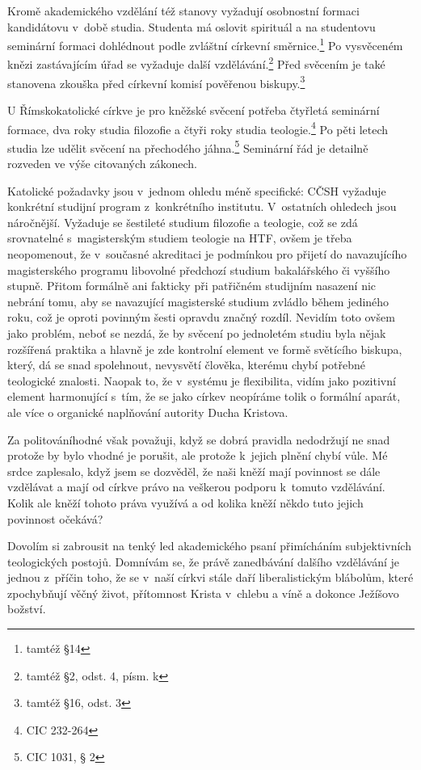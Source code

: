 Kromě akademického vzdělání též stanovy vyžadují osobnostní formaci kandidátovu
v~době studia. Studenta má oslovit spirituál a na studentovu seminární formaci
dohlédnout podle zvláštní církevní směrnice.\footnote{tamtéž §14}
Po vysvěceném knězi zastávajícím úřad se vyžaduje další
vzdělávání.\footnote{tamtéž §2, odst. 4, písm. k}
Před svěcením je také stanovena zkouška před církevní komisí pověřenou
biskupy.\footnote{tamtéž §16, odst. 3}

U Římskokatolické církve je pro kněžské svěcení potřeba čtyřletá seminární
formace, dva roky studia filozofie a čtyři roky studia teologie.\footnote{CIC
232-264} Po pěti letech studia lze udělit svěcení na přechodého
jáhna.\footnote{CIC 1031, § 2}
Seminární řád je detailně rozveden ve výše citovaných zákonech. 

Katolické požadavky jsou v~jednom ohledu méně specifické: CČSH vyžaduje
konkrétní studijní program z~konkrétního institutu. V~ostatních ohledech jsou
náročnější. Vyžaduje se šestileté studium filozofie a teologie, což se zdá
srovnatelné s~magisterským studiem teologie na HTF, ovšem je třeba neopomenout,
že v~současné akreditaci je podmínkou pro přijetí do navazujícího magisterského
programu libovolné předchozí studium bakalářského či vyššího stupně. Přitom
formálně ani fakticky při patřičném studijním nasazení nic nebrání tomu, aby se
navazující magisterské studium zvládlo během jediného roku, což je oproti
povinným šesti opravdu značný rozdíl. Nevidím toto ovšem jako problém, neboť se
nezdá, že by svěcení po jednoletém studiu byla nějak rozšířená praktika a hlavně
je zde kontrolní element ve formě světícího biskupa, který, dá se snad
spolehnout, nevysvětí člověka, kterému chybí potřebné teologické znalosti.
Naopak to, že v~systému je flexibilita, vidím jako pozitivní element harmonující
s~tím, že se jako církev neopíráme tolik o formální aparát, ale více o organické
naplňování autority Ducha Kristova.

Za politováníhodné však považuji, když se dobrá pravidla nedodržují ne snad
protože by bylo vhodné je porušit, ale protože k~jejich plnění chybí vůle. Mé
srdce zaplesalo, když jsem se dozvěděl, že naši kněží mají povinnost se dále
vzdělávat a mají od církve právo na veškerou podporu k~tomuto vzdělávání. Kolik
ale kněží tohoto práva využívá a od kolika kněží někdo tuto jejich povinnost
očekává?

Dovolím si zabrousit na tenký led akademického psaní přimícháním subjektivních
teologických postojů. Domnívám se, že právě zanedbávání dalšího vzdělávání je
jednou z~příčin toho, že se v~naší církvi stále daří liberalistickým blábolům,
které zpochybňují věčný život, přítomnost Krista v~chlebu a víně a dokonce
Ježíšovo božství.

